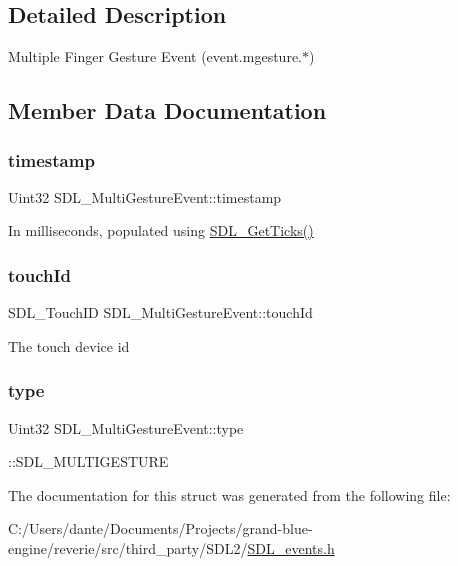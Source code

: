 \subsection{Detailed Description}
Multiple Finger Gesture Event (event.\+mgesture.$\ast$) 

\subsection{Member Data Documentation}
\mbox{\label{struct_s_d_l___multi_gesture_event_a7e99a98debf3ce11f6d2a2fbb3637175}} 
\subsubsection{\texorpdfstring{timestamp}{timestamp}}
{\footnotesize\ttfamily Uint32 S\+D\+L\+\_\+\+Multi\+Gesture\+Event\+::timestamp}

In milliseconds, populated using \mbox{\hyperlink{_s_d_l__timer_8h_a0b9bc71d6287e0ffafdc3419760fe2b3}{S\+D\+L\+\_\+\+Get\+Ticks()}} \mbox{\label{struct_s_d_l___multi_gesture_event_aa15d1201559a3c9277082af71a972dc1}} 
\subsubsection{\texorpdfstring{touchId}{touchId}}
{\footnotesize\ttfamily S\+D\+L\+\_\+\+Touch\+ID S\+D\+L\+\_\+\+Multi\+Gesture\+Event\+::touch\+Id}

The touch device id \mbox{\label{struct_s_d_l___multi_gesture_event_ab0c7adc9a3f71cc3532bfe0ff8cc6120}} 
\subsubsection{\texorpdfstring{type}{type}}
{\footnotesize\ttfamily Uint32 S\+D\+L\+\_\+\+Multi\+Gesture\+Event\+::type}

\+::\+S\+D\+L\+\_\+\+M\+U\+L\+T\+I\+G\+E\+S\+T\+U\+RE 

The documentation for this struct was generated from the following file\+:\begin{DoxyCompactItemize}
\item 
C\+:/\+Users/dante/\+Documents/\+Projects/grand-\/blue-\/engine/reverie/src/third\+\_\+party/\+S\+D\+L2/\mbox{\hyperlink{_s_d_l__events_8h}{S\+D\+L\+\_\+events.\+h}}\end{DoxyCompactItemize}
